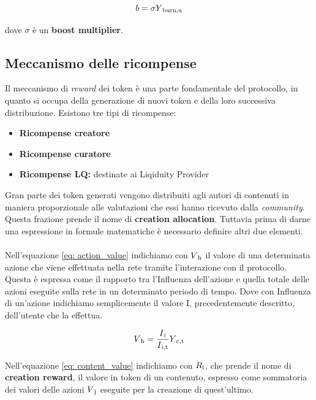 \begin{equation}\label{eq: boost_eq}
    b = \sigma Y\textsubscript{burn,u}
\end{equation}

dove $\sigma$ è un \textbf{boost multiplier}.

\subsection{Meccanismo delle ricompense}
Il meccanismo di \textit{reward} dei token è una parte fondamentale del protocollo, in quanto si occupa della generazione di nuovi token e della loro successiva distribuzione. Esistono tre tipi di ricompense:

\begin{itemize}
    \item \textbf{Ricompense creatore} 
    \item \textbf{Ricompense curatore} 
    \item \textbf{Ricompense LQ:} destinate ai Liqiduity Provider
\end{itemize}

Gran parte dei token generati vengono distribuiti agli autori di contenuti in maniera proporzionale alle valutazioni che essi hanno ricevuto dalla \textit{community}. Questa frazione prende il nome di \textbf{creation allocation}. Tuttavia prima di darne una espressione in formule matematiche è necessario definire altri due elementi.
\\
\\
Nell'equazione \ref{eq: action_value} indichiamo con $V\textsubscript{h}$ il valore di una determinata azione che viene effettuata nella rete tramite l'interazione con il protocollo. Questa è espressa come il rapporto tra l'Influenza dell'azione e quella totale delle azioni eseguite sulla rete in un determinato periodo di tempo. Dove con Influenza di un'azione indichiamo semplicemente il valore I, precedentemente descritto, dell'utente che la effettua. 

\begin{equation}\label{eq: action_value}
    V\textsubscript{h} = \frac{I\textsubscript{i}}{I\textsubscript{i,t}} Y\textsubscript{c,t}
\end{equation}

Nell'equazione \ref{eq: content_value} indichiamo con $R\textsubscript{i}$, che prende il nome di \textbf{creation reward}, il valore in token di un contenuto, espresso come sommatoria dei valori delle azioni $V\textsubscript{j}$ eseguite per la creazione di quest'ultimo.

